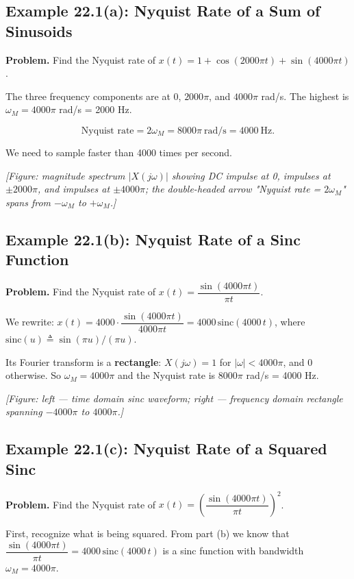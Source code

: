 \documentclass[11pt]{article}
\begin{document}
\subsection*{Example 22.1(a): Nyquist Rate of a Sum of Sinusoids}

\textbf{Problem.} Find the Nyquist rate of $x(t) = 1 + \cos(2000\pi t) + \sin(4000\pi t)$.

The three frequency components are at $0$, $2000\pi$, and $4000\pi$ rad/s. The highest is $\omega_M = 4000\pi$ rad/s = 2000 Hz.

\[\text{Nyquist rate} = 2\omega_M = 8000\pi\ \text{rad/s} = 4000\ \text{Hz}.\]

We need to sample faster than 4000 times per second.

\textit{[Figure: magnitude spectrum $|X(j\omega)|$ showing DC impulse at 0, impulses at $\pm 2000\pi$, and impulses at $\pm 4000\pi$; the double-headed arrow "Nyquist rate = $2\omega_M$" spans from $-\omega_M$ to $+\omega_M$.]}

\subsection*{Example 22.1(b): Nyquist Rate of a Sinc Function}

\textbf{Problem.} Find the Nyquist rate of $x(t) = \dfrac{\sin(4000\pi t)}{\pi t}$.

We rewrite: $x(t) = 4000 \cdot \dfrac{\sin(4000\pi t)}{4000\pi t} = 4000\,\mathrm{sinc}(4000\,t)$, where $\mathrm{sinc}(u) \triangleq \sin(\pi u)/(\pi u)$.

Its Fourier transform is a \textbf{rectangle}: $X(j\omega) = 1$ for $|\omega| < 4000\pi$, and $0$ otherwise. So $\omega_M = 4000\pi$ and the Nyquist rate is $8000\pi$ rad/s = 4000 Hz.

\textit{[Figure: left — time domain sinc waveform; right — frequency domain rectangle spanning $-4000\pi$ to $4000\pi$.]}

\subsection*{Example 22.1(c): Nyquist Rate of a Squared Sinc}

\textbf{Problem.} Find the Nyquist rate of $x(t) = \left(\dfrac{\sin(4000\pi t)}{\pi t}\right)^{2}$.

First, recognize what is being squared. From part (b) we know that $\dfrac{\sin(4000\pi t)}{\pi t} = 4000\,\mathrm{sinc}(4000\,t)$ is a sinc function with bandwidth $\omega_M = 4000\pi$.
\end{document}
